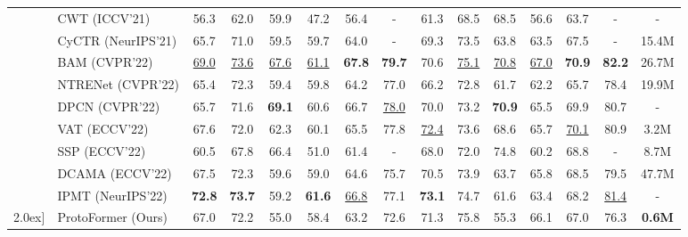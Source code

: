 \documentclass[journal]{IEEEtran}
\begin{document}
\begin{table*}
\begin{center}
{\begin{tabular}{cl|cccccc|cccccc|c}
            & CWT (ICCV'21)\cite{cwt} & 56.3 & 62.0 & 59.9 & 47.2 & 56.4 & - & 61.3 & 68.5 & 68.5 & 56.6 & 63.7 & - & - \\
            
            & CyCTR (NeurIPS'21)\cite{cyctr} & 65.7 & 71.0 & 59.5 & 59.7 & 64.0 & - & 69.3 & 73.5 & 63.8 & 63.5 & 67.5 & - & 15.4M \\
            
            & BAM (CVPR'22)\cite{bam} & \underline{69.0} & \underline{73.6} & \underline{67.6} & \underline{61.1} & \textbf{67.8} & \textbf{79.7} & 70.6 & \underline{75.1} & \underline{70.8} & \underline{67.0} & \textbf{70.9} & \textbf{82.2} & 26.7M \\
            
            & NTRENet (CVPR'22)\cite{ntrenet} & 65.4 & 72.3 & 59.4 & 59.8 & 64.2 & 77.0 & 66.2 & 72.8 & 61.7 & 62.2 & 65.7 & 78.4 &19.9M \\
            
            & DPCN (CVPR'22)\cite{dpcn} & 65.7 & 71.6 & \textbf{69.1} & 60.6 & 66.7 & \underline{78.0} & 70.0 & 73.2 & \textbf{70.9} & 65.5 & 69.9 & 80.7 & - \\
            
            & VAT (ECCV'22)\cite{vat} & 67.6 & 72.0 & 62.3 & 60.1 & 65.5 & 77.8 & \underline{72.4} & 73.6 & 68.6 & 65.7 & \underline{70.1} & 80.9 & 3.2M \\
            & SSP (ECCV'22) \cite{ssp} & 60.5 & 67.8 & 66.4 & 51.0 & 61.4 & - & 68.0 & 72.0 & 74.8 & 60.2 & 68.8 & - & 8.7M \\
            
            & DCAMA (ECCV'22)\cite{dcama} & 67.5 & 72.3 & 59.6 & 59.0 & 64.6 & 75.7 & 70.5 & 73.9 & 63.7 & 65.8 & 68.5 & 79.5 & 47.7M \\
            
            & IPMT (NeurIPS'22)\cite{ipmt} & \textbf{72.8} & \textbf{73.7} & 59.2 & \textbf{61.6} & \underline{66.8} & 77.1 & \textbf{73.1} & 74.7 & 61.6 & 63.4 & 68.2 & \underline{81.4} & - \\
            \cline{2-15} \-2.0ex]
            & ProtoFormer (Ours) & 67.0 & 72.2 & 55.0 & 58.4 & 63.2 & 72.6 & 71.3 & 75.8 & 55.3 & 66.1 & 67.0 & 76.3 & \textbf{0.6M} \\
            
            \bottomrule
    \end{tabular}
    }
    \vspace{-2.0mm}
    \end{center}
\end{table*}
\end{document}
